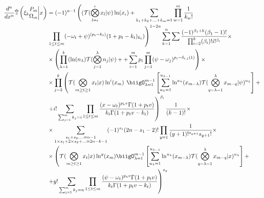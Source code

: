 \begin{align}
        \frac{d^n}{dx^n}\hat{\mathbb{T}}\left( \xi_k \begin{matrix} P_m 
        \\ \Omega_m \end{matrix} \bigg| x  \right) &= (-1)^{n-1}\left( 
        (\mathcal{T}(\bigotimes_{l=\iota}^\iota x_l |\psi)\ln(x_\iota) +
        \sum_{k_1 + k_2 + ... + k_m = 1}\prod_{w=1}^m\frac{1}{k_w!} \right.
        \\ &\left.\prod_{1 \leq t \leq m}(-\omega_t + \psi)^{(p_t - k_t)}(1+p_t-
        k_t)_{k_t})\right)^{1-2n}\sum_{k=1}^n \sum \frac{(-1)^{\beta_1 + k}(\beta_1
        -1)!}{\prod_{i=2}^k (\beta_i)!i!^{\beta_i}} \times\\ & \times \left(\prod_{\lambda 
        = 1}^k (\ln(n_\lambda) \mathcal{T}(\bigotimes_{j=1}^\lambda n_j |\psi) + 
        +\sum_{i=1}^m p_i \prod_{j=1}^m (\psi-\omega_j)^{p_i-\delta_{i, j}(1)} \right) 
        \times \\ & \times \prod_{j=2}^k
        \left(\mathcal{T}(\bigotimes_{m \geq t \geq 1}x_t| x) \ln^i (x_m) \right.
        \left. \biigO_{\lambda = 1}^{m-1} \left[\sum_{u_{\lambda}=1}^{u_{\lambda-1}}
        \ln^{u_{\lambda}}(x_{m-\lambda}) \mathcal{T}(\bigotimes_{q = \lambda-1}^\lambda
        x_{m-q} |\psi)^{u_{\lambda}} \right] + \right.\\
        &\left.+ i! \sum_{\sum_{j=1}^m k_j = i}\prod_{1 \leq t \leq m} \frac{(x - \omega_t)^{p_k v}
        \Gamma(1+p_t v)}{k_t\Gamma(1+p_t v - k_t)}\right)^{\beta_i}
        \frac{1}{(k-1)!} \times \\ & \times \sum_{\substack{s_1 + s_2 . ... = n-1 \\ 1\times s_1 
        + 2 \times s_2 + ... = 2n-k-1}}(-1)^{s_1}(2n-s_1 -2)! \prod_{y = 1}\frac{1}{(y+1)!^{s_{y+1}}
        s_{y+1}!} \times \\ & \times 
        \left( \mathcal{T}(\bigotimes_{m \geq t \geq 1}x_t| x) \ln^y (x_m) \biigO_{\lambda = 1}^{m-1}
        \left[\sum_{u_{\lambda}=1}^{u_{\lambda-1}}\ln^{u_{\lambda}}(x_{m-\lambda}) \mathcal{T}(
        \bigotimes_{q = \lambda-1}^\lambda x_{m-q} |x)^{u_{\lambda}} \right] + 
        \right. \\ & \left. + y! \sum_{\sum_{j=1}^m k_j = n}\prod_{1 \leq t \leq m} \frac{(\psi -
        \omega_t)^{p_k v}\Gamma(1+p_t v)}{k_t\Gamma(1+p_t v - k_t)}
        \right)^{s_y}
\end{align}

